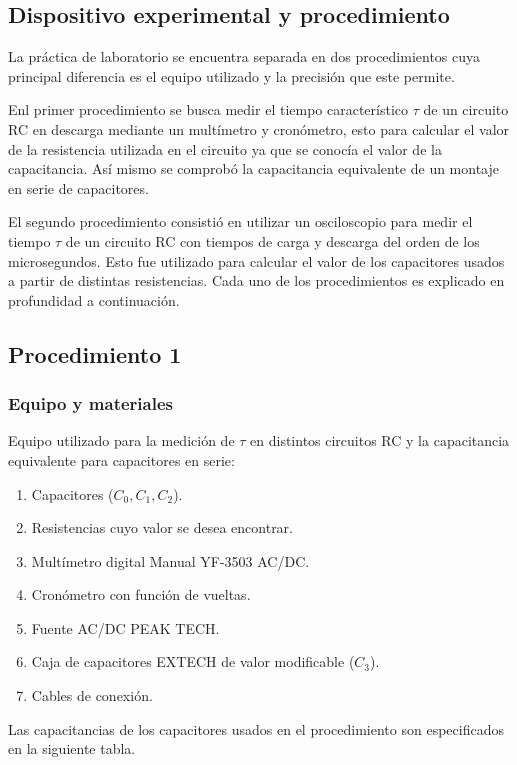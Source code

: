 \documentclass[10pt,letter]{article}
\begin{document}
\begin{multicols}{2}
\section{Dispositivo experimental y procedimiento}
La práctica de laboratorio se encuentra separada en dos procedimientos cuya principal diferencia es el equipo utilizado y la precisión que este permite. 

Enl primer procedimiento se busca medir el tiempo característico $\tau$ de un circuito RC en descarga mediante un multímetro y cronómetro, esto para calcular el valor de la resistencia utilizada en el circuito ya que se conocía el valor de la capacitancia. Así mismo se comprobó la capacitancia equivalente de un montaje en serie de capacitores. 

El segundo procedimiento consistió en utilizar un osciloscopio para medir el tiempo $\tau$ de un circuito RC con tiempos de carga y descarga del orden de los microsegundos. Esto fue utilizado para calcular el valor de los capacitores usados a partir de distintas resistencias. Cada uno de los procedimientos es explicado en profundidad a continuación.

\subsection{Procedimiento 1}
\subsubsection{Equipo y materiales}
Equipo utilizado para la medición de $\tau$ en distintos circuitos RC y la capacitancia equivalente  para capacitores en serie:
\begin{enumerate}
\itemsep=0em
\item Capacitores ($C_0,C_1,C_2$).
\item Resistencias cuyo valor se desea encontrar.
\item Multímetro digital Manual YF-3503 AC/DC.
\item Cronómetro con función de vueltas. 
\item Fuente AC/DC PEAK TECH.
\item Caja de capacitores EXTECH de valor modificable ($C_3$).
\item Cables de conexión.
\end{enumerate}

Las capacitancias de los capacitores usados en el procedimiento son especificados en la siguiente tabla.


\end{multicols}
\end{document}

